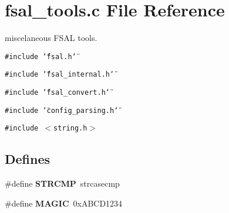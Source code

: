 \section{fsal\_\-tools.c File Reference}
\label{fsal__tools_8c}
miscelaneous FSAL tools.  


{\tt \#include \char`\"{}fsal.h\char`\"{}}\par
{\tt \#include \char`\"{}fsal\_\-internal.h\char`\"{}}\par
{\tt \#include \char`\"{}fsal\_\-convert.h\char`\"{}}\par
{\tt \#include \char`\"{}config\_\-parsing.h\char`\"{}}\par
{\tt \#include $<$string.h$>$}\par
\subsection*{Defines}
\begin{CompactItemize}
\item 
\#define \textbf{STRCMP}~strcasecmp\label{fsal__tools_8c_1ffef5879101d778f17a377e0d8b0e00}

\item 
\#define \textbf{MAGIC}~0xABCD1234\label{fsal__tools_8c_94630370ae389fb1189282fa0742f310}

\end{CompactItemize}
